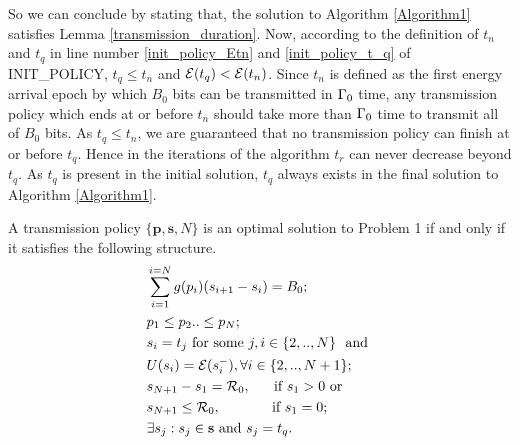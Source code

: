 So we can conclude by stating that, the solution to Algorithm \ref{Algorithm1} satisfies Lemma \ref{transmission_duration}. Now, according to the definition of $t_n$ and $t_q$ in line number \ref{init_policy_Etn} and \ref{init_policy_t_q} of INIT\_POLICY, $t_q\le t_n$ and $\mathcal{E}(t_q)<\mathcal{E}(t_n)$. Since $t_n$ is defined as the first energy arrival epoch by which $B_0$ bits can be transmitted in $\Gamma_0$ time, any transmission policy which ends at or before $t_n$ should take more than $\Gamma_0$ time to transmit all of $B_0$ bits. As $t_q\le t_n$, we are guaranteed that no transmission policy can finish at or before $t_q$. Hence in the iterations of the algorithm $t_r$ can never decrease beyond $t_q$. As $t_q$ is present in the initial solution, $t_q$ always exists in the final solution to Algorithm \ref{Algorithm1}.   
\begin{theorem}
A transmission policy $\{\textbf{p},\textbf{s},N\}$ is an optimal solution to Problem 1 if and only if it satisfies the following structure.
\label{th_algo1_1}
\begin{align}
&\sum_{i=1}^{i=N}g(p_i)(s_{i+1}-s_i)=B_0; 								
\label{claim1}
\\
&p_1\le p_2 ..\le p_N;
\label{claim3}  
\\
&\nonumber s_i=t_j \text{ for some } j, i\in \{2,..,N\} \ \text{ and }
\\
& U(s_i)=\ETx(s_i^-), \forall i\in \{2,..,N+1\};
\label{claim4}
\\
&\nonumber s_{N+1}-s_1=\mathcal{R}_0, 	 \ \ \ \ 						\text{ if } s_1>0 \text{ or }
\\
& s_{N+1}\le \mathcal{R}_0,				\ \ \ \ \ \ \ \ \ \				\text{ if } s_1=0;
\label{claim2}
\\
&\exists s_j:s_j\in \textbf{s} \text{ and } s_j=t_q.
\label{claim5}
\end{align}
\end{theorem}

